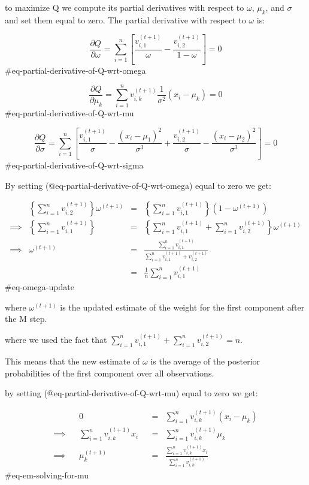to maximize Q we compute its partial derivatives with respect to $\omega$, $\mu_k$, and $\sigma$ and set them equal to zero.
The partial derivative with respect to $\omega$ is:


$$
\frac{\partial Q}{\partial \omega} = \sum_{i=1}^n \left [\frac{v_{i,1}^{(t+1)}}{\omega} - \frac{v_{i,2}^{(t+1)}}{1-\omega} \right ] = 0
$$ {#eq-partial-derivative-of-Q-wrt-omega}

$$
\frac{\partial Q}{\partial \mu_k} = \sum_{i=1}^n v_{i,k}^{(t+1)} \frac{1}{\sigma^2} (x_i - \mu_k) = 0
$$ {#eq-partial-derivative-of-Q-wrt-mu}


$$
\frac{\partial Q}{\partial \sigma} = \sum_{i=1}^n \left [\frac{v_{i,1}^{(t+1)}}{\sigma} - \frac{(x_i - \mu_1)^2}{\sigma^3} + \frac{v_{i,2}^{(t+1)}}{\sigma} - \frac{(x_i - \mu_2)^2}{\sigma^3} \right ] = 0
$$ {#eq-partial-derivative-of-Q-wrt-sigma}


By setting (@eq-partial-derivative-of-Q-wrt-omega) equal to zero we get:

$$ 
\begin{aligned}
&\left \{ \sum_{i=1}^n v_{i,2}^{(t+1)} \right \}  \omega^{(t+1)} & = &
\left \{ \sum_{i=1}^n v_{i,1}^{(t+1)} \right \} \left (1 - \omega^{(t+1)}\right) 
\\ \implies & \left \{ \sum_{i=1}^n v_{i,1}^{(t+1)} \right \} & = &
\left \{ \sum_{i=1}^n v_{i,1}^{(t+1)} + \sum_{i=1}^n v_{i,2}^{(t+1)} \right \} \omega^{(t+1)}
\\ \implies & \omega^{(t+1)} & = & \frac{\sum_{i=1}^n v_{i,1}^{(t+1)}}{\sum_{i=1}^n v_{i,1}^{(t+1)} + v_{i,2}^{(t+1)}} 
\\ &  &= & \frac{1}{n} \sum_{i=1}^n v_{i,1}^{(t+1)}
\end{aligned}
$$ {#eq-omega-update}

where $\omega^{(t+1)}$ is the updated estimate of the weight for the first component after the M step.

where we used the fact that $\sum_{i=1}^n v_{i,1}^{(t+1)} + \sum_{i=1}^n v_{i,2}^{(t+1)} = n$.

This means that the new estimate of $\omega$ is the average of the posterior probabilities of the first component over all observations.

by setting (@eq-partial-derivative-of-Q-wrt-mu) equal to zero we get:

$$\begin{aligned}
            && 0 && = & \sum_{i=1}^n v_{i,k}^{(t+1)} (x_i - \mu_k) 
\\ \implies && \sum_{i=1}^n v_{i,k}^{(t+1)} x_i && = & \sum_{i=1}^n v_{i,k}^{(t+1)} \mu_k
\\ \implies && \mu_k^{(t+1)} && = & \frac{\sum_{i=1}^n v_{i,k}^{(t+1)} x_i}{\sum_{i=1}^n v_{i,k}^{(t+1)}}
\end{aligned}
$$ {#eq-em-solving-for-mu}

